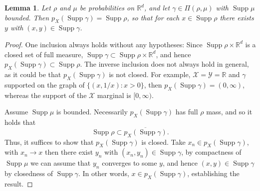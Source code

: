 \documentclass[11pt, oneside, titlepage]{book}
\theoremstyle{plain}
\newtheorem{lemma}[theorem]{Lemma}
\theoremstyle{definition}
\newcommand{\R}{\mathbb{R}}
\newcommand{\X}{\mathcal{X}}
\newcommand{\Y}{\mathcal{Y}}
\DeclareMathOperator{\supp}{Supp}
\begin{document}
\begin{lemma}
\label{app: support projection lemma}
    Let $\rho$ and $\mu$ be probabilities on $\R^d$, and let $\gamma\in \Pi(\rho, \mu)$ with $\supp \mu$ bounded. Then $p_X(\supp \gamma) = \supp \rho$, so that for each $x \in \supp \rho$ there exists $y$ with $(x, y) \in \supp \gamma$. 
\end{lemma}
\begin{proof}
    One inclusion always holds without any hypotheses: Since $\supp \rho \times \R^d$ is a closed set of full measure, $\supp \gamma \subset \supp \rho \times \R^d$, and hence $p_X(\supp \gamma)  \subset \supp \rho$.
    The inverse inclusion does not always hold in general, as it could be that $p_X(\supp \gamma)$ is not closed. For example, $\X=\Y = \R$ and $\gamma$ supported on the graph of $\{ (x, 1/x) : x >0\}$, then $p_X(\supp \gamma) = (0, \infty)$, whereas the support of the $\X$ marginal is $[0, \infty)$.

    Assume $\supp \mu$ is bounded. Necessarily $p_X(\supp \gamma)$ has full $\rho$ mass, and so it holds that
    \begin{equation*}
        \supp \rho \subset \overline{p_X(\supp \gamma)}.
    \end{equation*}
    Thus, it suffices to show that $p_X(\supp \gamma)$ is closed. Take $x_n \in p_X(\supp \gamma)$, with $x_n \to x$ then there exist $y_n$ with $(x_n, y_n) \in \supp \gamma$, by compactness of $\supp \mu$ we can assume that $y_n$ converges to some $y$, and hence $(x, y) \in \supp \gamma$ by closedness of $\supp \gamma$. In other words, $x \in p_X(\supp \gamma)$, establishing the result.
\end{proof}
\end{document}
